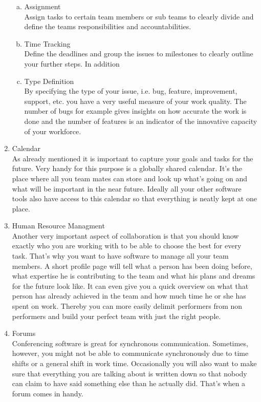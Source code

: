 \begin{multicols}{2}
\begin{enumerate}[1.]
		\begin{enumerate}[a)]
		  \item Assignment\\
Assign tasks to certain team members or sub teams to clearly divide and define the teams responsibilities and accountabilities. 
		  \item Time Tracking\\
Define the deadlines and group the issues to milestones to clearly outline your further steps.
In addition 
		  \item Type Definition\\
By specifying the type of your issue, i.e. bug, feature, improvement, support, etc. you have a very useful measure of your work quality. The number of bugs for example gives insights on how accurate the work is done and the number of features is an indicator of the innovative capacity of your workforce.
		\end{enumerate}
	\item Calendar\\
As already mentioned it is important to capture your goals and tasks for the future. Very handy for this purpose is a globally shared calendar. It’s the place where all you team mates can store and look up what’s going on and what will be important in the near future. Ideally all your other software tools also have access to this calendar so that everything is neatly kept at one place.
	\item Human Resource Managment\\
Another very important aspect of collaboration is that you should know exactly who you are working with to be able to choose the best for every task. That’s why you want to have software to manage all your team members. A short profile page will tell what a person has been doing before, what expertise he is contributing to the team and what his plans and dreams for the future look like.
It can even give you a quick overview on what that person has already achieved in the team and how much time he or she has spent on work. Thereby you can more easily delimit performers from non performers and build your perfect team with just the right people.
	\item Forums\\
Conferencing software is great for synchronous communication. Sometimes, however, you might not be able to communicate synchronously due to time shifts or a general shift in work time. Occasionally you will also want to make sure that everything you are talking about is written down so that nobody can claim to have said something else than he actually did. That’s when a forum comes in handy.

\end{enumerate}
\end{multicols}
